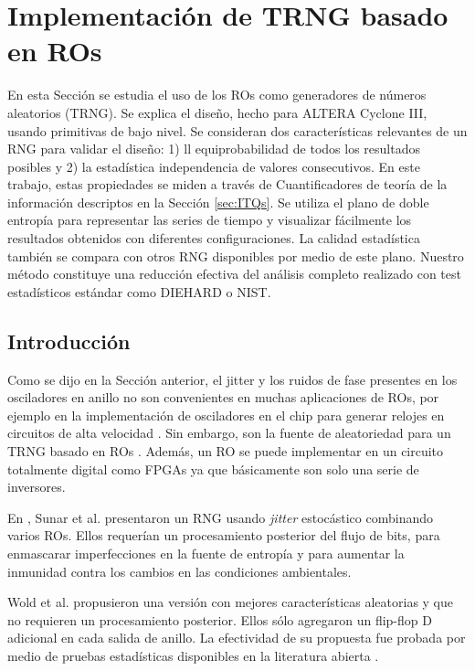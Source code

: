 \section{Implementación de {TRNG} basado en {RO}s}
\label{secRoTRNG}

En esta Sección se estudia el uso de los {RO}s como generadores de números aleatorios ({TRNG}).
Se explica el diseño, hecho para {ALTERA Cyclone} III, usando primitivas de bajo nivel.
Se consideran dos características relevantes de un {RNG} para validar el diseño: 1) ll equiprobabilidad de todos los resultados posibles y 2) la estadística independencia de valores consecutivos.
En este trabajo, estas propiedades se miden a través de Cuantificadores de teoría de la información descriptos en la Sección \ref{sec:ITQs}.
Se utiliza el plano de doble entropía para representar las series de tiempo y visualizar fácilmente los resultados obtenidos con diferentes configuraciones.
La calidad estadística también se compara con otros {RNG} disponibles por medio de este plano.
Nuestro método constituye una reducción efectiva del análisis completo realizado con test estadísticos estándar como {DIEHARD} o {NIST}.

\subsection{Introducción}
\label{sec:IntroROTRNG}

Como se dijo en la Sección anterior, el jitter y los ruidos de fase presentes en los osciladores en anillo no son convenientes en muchas aplicaciones de {RO}s, por ejemplo en la implementación de {osciladores en el chip} para generar relojes en circuitos de alta velocidad \cite{Hajimiri1999, Mandal2010, Gupta2011}.
Sin embargo, son la fuente de aleatoriedad para un {TRNG} basado en {RO}s \cite{Sunar2007, Wold2009}.
Además, un {RO} se puede implementar en un circuito totalmente digital como {FPGA}s ya que básicamente son solo una serie de inversores.

En \cite{Sunar2007}, Sunar et al. presentaron un {RNG} usando \textit{jitter} estocástico combinando varios {RO}s.
Ellos requerían un procesamiento posterior del flujo de bits, para enmascarar imperfecciones en la fuente de entropía y para aumentar la inmunidad contra los cambios en las condiciones ambientales.

Wold et al. \cite{Wold2009} propusieron una versión con mejores características aleatorias y que no requieren un procesamiento posterior.
Ellos sólo agregaron un flip-flop D adicional en cada salida de anillo.
La efectividad de su propuesta fue probada por medio de pruebas estadísticas disponibles en la literatura abierta \cite{NIST2000, Marsaglia1995, NIST2000a}.

